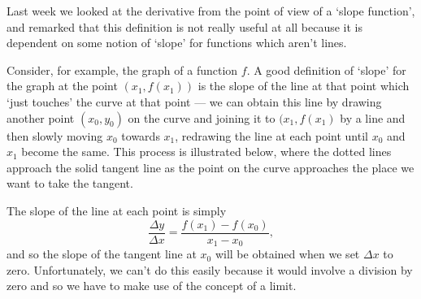 



Last week we looked at the derivative from the point of view of a `slope function', and remarked that this definition is not really useful at all
because it is dependent on some notion of `slope' for functions which aren't lines.

Consider, for example, the graph of a function $ f $. A good definition of `slope' for the graph at the point $ (x_1, f(x_1)) $ is the slope of the
line at that point which `just touches' the curve at that point --- we can obtain this line by drawing another point $ (x_0, y_0) $ on the curve and
joining it to $ (x_1, f(x_1) $ by a line and then slowly moving $ x_0 $ towards $ x_1 $, redrawing the line at each point until $ x_0 $ and $ x_1 $
become the same. This process is illustrated below, where the dotted lines approach the solid tangent line as the point on the curve approaches the
place we want to take the tangent.

\begin{center}
\end{center}

The slope of the line at each point is simply
\begin{displaymath}
  \frac{\Delta y}{\Delta x} = \frac{f(x_1) - f(x_0)}{x_1 - x_0},
\end{displaymath}
and so the slope of the tangent line at $ x_0 $ will be obtained when we set $ \Delta x $ to zero. Unfortunately, we can't
do this easily because it would involve a division by zero and so we have to make use of the concept of a limit.

